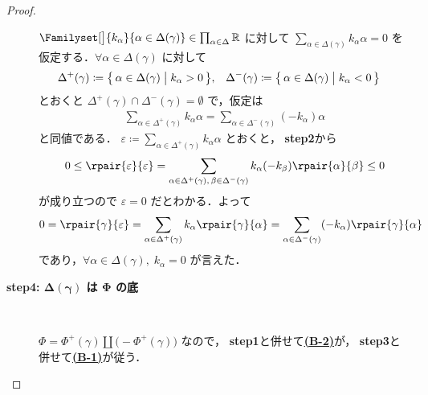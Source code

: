 \documentclass[rep_main]{subfiles}
\begin{document}
\begin{proof}
\begin{description}
		$\Familyset[\big]{k_\alpha}{\alpha \in \Delta (\gamma)} \in \prod_{\alpha \in \Delta} \mathbb{R}$ に対して $\sum_{\alpha \in \Delta (\gamma)} k_\alpha \alpha = 0$ を仮定する．$\forall \alpha \in \Delta(\gamma)$ に対して
		\begin{align}
			\Delta^+(\gamma) &\coloneqq \bigl\{\, \alpha \in \Delta(\gamma) \bigm| k_\alpha > 0 \,\bigr\}, &
			\Delta^-(\gamma) &\coloneqq \bigl\{\, \alpha \in \Delta(\gamma) \bigm| k_\alpha < 0 \,\bigr\}
		\end{align}
		とおくと $\Delta^+(\gamma) \cap \Delta^-(\gamma) = \emptyset$ で，仮定は
		\begin{align}
			\sum_{\alpha \in \Delta^+(\gamma)} k_\alpha \alpha = \sum_{\alpha \in \Delta^-(\gamma)} (-k_\alpha) \alpha
		\end{align}
		と同値である．
		$\varepsilon \coloneqq \sum_{\alpha \in \Delta^+ (\gamma)} k_\alpha \alpha$ とおくと，
		\textsf{\textbf{step2}}から
		\begin{align}
			0 \le \rpair{\varepsilon}{\varepsilon} = \sum_{\alpha \in \Delta^+(\gamma),\, \beta \in \Delta^-(\gamma)} k_\alpha (-k_\beta) \rpair{\alpha}{\beta} \le 0
		\end{align}
		が成り立つので $\varepsilon = 0$ だとわかる．よって
		\begin{align}
			0 &= \rpair{\gamma}{\varepsilon}
			= \sum_{\alpha \in \Delta^+(\gamma)} k_\alpha \rpair{\gamma}{\alpha}
			= \sum_{\alpha \in \Delta^-(\gamma)} (-k_\alpha) \rpair{\gamma}{\alpha}
		\end{align}
		であり，$\forall \alpha \in \Delta(\gamma),\; k_\alpha = 0$ が言えた．
		
		\item[\textbf{step4: $\bm{\Delta(\gamma)}$ は $\bm{\Phi}$ の底}]　
		
		$\Phi = \Phi^+ (\gamma) \amalg \bigl( -\Phi^+ (\gamma) \bigr)$ なので，
		\textsf{\textbf{step1}}と併せて\hyperref[def:base-root]{\textsf{\textbf{(B-2)}}}が，
		\textsf{\textbf{step3}}と併せて\hyperref[def:base-root]{\textsf{\textbf{(B-1)}}}が従う．


\end{description}
\end{proof}
\end{document}
